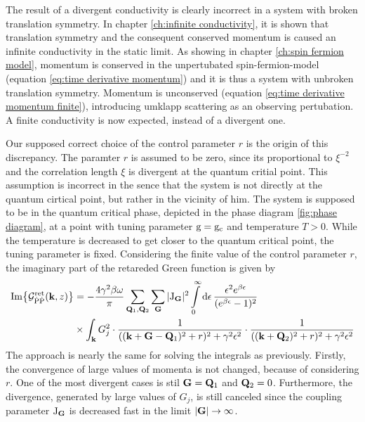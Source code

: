 The result of a divergent conductivity is clearly incorrect in a system with broken translation symmetry.
In chapter \ref{ch:infinite conductivity}, it is shown that translation symmetry and the consequent conserved momentum is caused an infinite conductivity in the static limit.
As showing in chapter \ref{ch:spin fermion model}, momentum is conserved in the unpertubated spin-fermion-model (equation \eqref{eq:time derivative momentum}) and it is thus a system with unbroken translation symmetry.
Momentum is unconserved (equation \eqref{eq:time derivative momentum finite}), introducing umklapp scattering as an observing pertubation.
A finite conductivity is now expected, instead of a divergent one.

Our supposed correct choice of the control parameter $r$ is the origin of this discrepancy.
The paramter $r$ is assumed to be zero, since its proportional to $\xi^{-2}$ and the correlation length $\xi$ is divergent at the quantum critial point.
This assumption is incorrect in the sence that the system is not directly at the quantum cirtical point, but rather in the vicinity of him.
The system is supposed to be in the quantum critical phase, depicted in the phase diagram \ref{fig:phase diagram}, at a point with tuning parameter $\mathrm{g} = \mathrm{g}_{\mathrm{c}}$ and temperature $ T > 0$.
While the temperature is decreased to get closer to the quantum critical point, the tuning parameter is fixed.
Considering the finite value of the control parameter $r$, the imaginary part of the retareded Green function is given by
%
\begin{align}
	\Im{\mathcal{G}_{\dot{\mathrm{P}}\dot{\mathrm{P}}}^{\mathrm{ret}}(\vb{k}, z)} &= 
		-\frac{4 \gamma^{2} \beta \omega}{\pi}
		\sum\limits_{\vb{Q}_{1}, \vb{Q}_{2}}
		\sum\limits_{\vb{G}}
		\vert \mathrm{J}_{\vb{G}} \vert^{2}
		\int\limits_{0}^{\infty} \dd{\epsilon}
		\frac{\epsilon^{2} e^{\beta \epsilon}}{(e^{\beta \epsilon} - 1)^{2}}
		\notag \\
		&\times
		\int_{\vb{k}} G_{j}^{2} \cdot
		\frac{1}{((\vb{k}+\vb{G}-\vb{Q}_{1})^{2} + r)^{2} + \gamma^{2} \epsilon^{2}} \cdot
		\frac{1}{((\vb{k} + \vb{Q}_{2})^{2} + r)^{2} + \gamma^{2} \epsilon^{2}}
\end{align}
%
The approach is nearly the same for solving the integrals as previously.
Firstly, the convergence of large values of momenta is not changed, because of considering $r$.
One of the most divergent cases is stil $\vb{G} = \vb{Q}_{1}$ and $\vb{Q}_{2} = 0$.
Furthermore, the divergence, generated by large values of $G_{j}$, is still canceled since the coupling parameter $\mathrm{J}_{\vb{G}}$ is decreased fast in the limit $|\vb{G}| \to \infty$.
